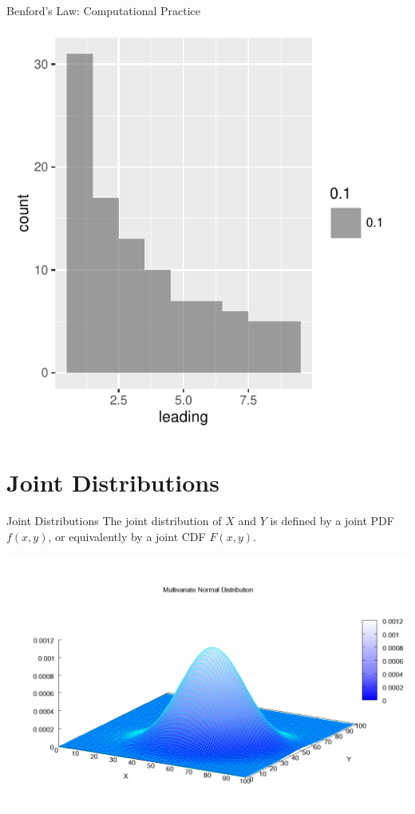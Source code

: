 \documentclass{beamer}
\begin{document}
\begin{frame}{Benford's Law: Computational Practice}
\begin{center}\includegraphics[scale=.7]{figures/Benford_powers_of_2.pdf}\end{center}
\end{frame}

\section{Joint Distributions}
\begin{frame}{Joint Distributions}
The joint distribution of $X$ and $Y$ is defined by a \alert{joint PDF} $f(x,y)$, or equivalently by a \alert{joint CDF} $F(x,y)$.

\begin{center}\includegraphics[scale=.2]{figures/Multivariate_Gaussian.png}\end{center}
\end{frame}
\end{document}
